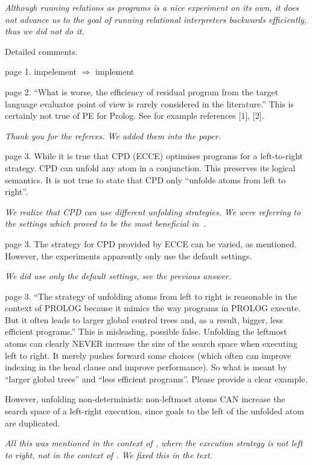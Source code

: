\emph{Although running \mk relations as \pro programs is a nice experiment on its own, it does not advance us to the goal of running relational interpreters backwards efficiently, thus we did not do it.}

Detailed comments.

page 1. impelement $\Rightarrow$ implement

page 2.  ``What is worse, the efficiency of residual program from the target language evaluator point of view is rarely considered in the literature.'' This is certainly not true of PE for Prolog.  See for example references [1], [2].

\emph{Thank you for the referces. We added them into the paper.}

page 3.  While it is true that CPD (ECCE) optimises programs for a left-to-right strategy. CPD can unfold any atom in a conjunction.  This preserves its logical semantics.  It is not true to state that CPD only ``unfolds atoms from left to right''.

\emph{We realize that CPD can use different unfolding strategies. We were referring to the settings which proved to be the most beneficial in~\cite{leuschel1997advanced}.}

page 3.  The strategy for CPD provided by ECCE can be varied, as mentioned.  However, the experiments apparently only use the default settings.

\emph{We did use only the default settings, see the previous answer.}

page 3. ``The strategy of unfolding atoms from left to right is reasonable in the context of PROLOG because it mimics the way programs in PROLOG execute. But it often leads to larger global control trees and, as a result, bigger, less efficient programs.''  This is misleading, possible false.  Unfolding the leftmost atoms can clearly NEVER increase the size of the search space when executing left to right.  It merely pushes forward some choices (which often can improve indexing in the head clause and improve performance). So what is meant by ``larger global trees'' and ``less efficient programs''. Please provide a clear example.

However, unfolding non-deterministic non-leftmost atoms CAN increase the search space of a left-right execution, since goals to the left of the unfolded atom are duplicated.

\emph{All this was mentioned in the context of \mk, where the execution strategy is not left to right, not in the context of \pro. We fixed this in the text.}



